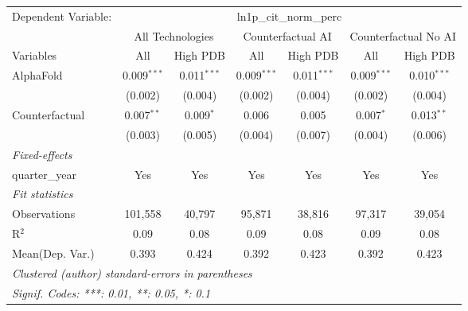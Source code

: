 \begingroup
\centering
\begin{tabular}{lcccccc}
   \tabularnewline \midrule \midrule
   Dependent Variable: & \multicolumn{6}{c}{ln1p\_cit\_norm\_perc}\\
 & \multicolumn{2}{c}{All Technologies} & \multicolumn{2}{c}{Counterfactual AI} & \multicolumn{2}{c}{Counterfactual No AI} \\
\cmidrule(lr){1-1}\cmidrule(lr){2-3} \cmidrule(lr){4-5} \cmidrule(lr){6-7}
Variables & \multicolumn{1}{c}{All} & \multicolumn{1}{c}{High PDB} & \multicolumn{1}{c}{All} & \multicolumn{1}{c}{High PDB} & \multicolumn{1}{c}{All} & \multicolumn{1}{c}{High PDB} \\
\cmidrule(lr){1-1}\cmidrule(lr){2-2} \cmidrule(lr){3-3} \cmidrule(lr){4-4} \cmidrule(lr){5-5} \cmidrule(lr){6-6} \cmidrule(lr){7-7}
   AlphaFold      & 0.009$^{***}$ & 0.011$^{***}$ & 0.009$^{***}$ & 0.011$^{***}$ & 0.009$^{***}$ & 0.010$^{***}$\\   
                  & (0.002)       & (0.004)       & (0.002)       & (0.004)       & (0.002)       & (0.004)\\   
   Counterfactual & 0.007$^{**}$  & 0.009$^{*}$   & 0.006         & 0.005         & 0.007$^{*}$   & 0.013$^{**}$\\   
                  & (0.003)       & (0.005)       & (0.004)       & (0.007)       & (0.004)       & (0.006)\\   
   \midrule
   \emph{Fixed-effects}\\
   quarter\_year  & Yes           & Yes           & Yes           & Yes           & Yes           & Yes\\  
   \midrule
   \emph{Fit statistics}\\
   Observations   & 101,558       & 40,797        & 95,871        & 38,816        & 97,317        & 39,054\\  
   R$^2$          & 0.09          & 0.08          & 0.09          & 0.08          & 0.09          & 0.08\\  
Mean(Dep. Var.) & 0.393 & 0.424 & 0.392 & 0.423 & 0.392 & 0.423 \\
   \midrule \midrule
   \multicolumn{7}{l}{\emph{Clustered (author) standard-errors in parentheses}}\\
   \multicolumn{7}{l}{\emph{Signif. Codes: ***: 0.01, **: 0.05, *: 0.1}}\\
\end{tabular}
\par\endgroup
